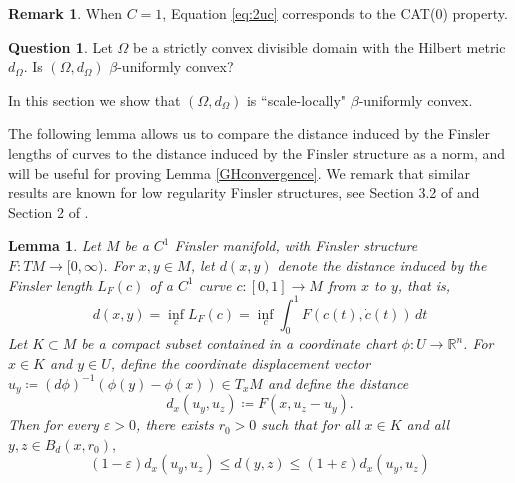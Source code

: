 \documentclass[letterpaper, 11pt, reqno]{amsart}
\newtheorem{lemma}[thm]{Lemma}
\theoremstyle{definition}
\newtheorem{rem}[thm]{Remark}
\newtheorem{question}[thm]{Question}
\begin{document}
\begin{rem}
    When $C=1$, Equation \ref{eq:2uc} corresponds to the CAT(0) property.
\end{rem}

\begin{question}\label{question}
    Let $\Omega$ be a strictly convex divisible domain with the Hilbert metric $d_\Omega$. Is $(\Omega,d_\Omega)$ $\beta$-uniformly convex? 
\end{question}


In this section we show that $(\Omega, d_\Omega)$ is ``scale-locally" $\beta$-uniformly convex. 

The following lemma allows us to compare the distance induced by the Finsler lengths of curves to the distance induced by the Finsler structure as a norm, and will be useful for proving Lemma \ref{GHconvergence}. We remark that similar results are known for low regularity Finsler structures, see Section 3.2 of \cite{LY} and Section 2 of \cite{MT}.

\begin{lemma}\label{closelemma}
    Let $M$ be a $C^1$ Finsler manifold, with Finsler structure $F: TM \rightarrow [0, \infty)$. For $x, y\in M$, let $d(x,y)$ denote the distance  induced by the Finsler length $L_F(c)$ of a $C^1$ curve $c:[0,1] \rightarrow M$ from $x$ to $y$, that is,
    \begin{equation}
        d(x,y) = \inf_cL_F(c)= \inf_c\int_{0}^{1} F(c(t),\dot{c}(t)) \,dt
    \end{equation}
    Let $K \subset M$ be a compact subset contained in a coordinate chart $\phi: U \rightarrow \mathbb{R}^n$. For $x \in K$ and $y \in U$, define the coordinate displacement vector $u_y \coloneq (d\phi)^{-1}(\phi(y) - \phi(x)) \in T_xM$ and define the distance 
    \begin{equation}
    d_x(u_y,u_z) \coloneq F(x, u_z-u_y).
    \end{equation} 
    Then for every $\varepsilon > 0$, there exists $r_0>0$ such that for all $x \in K$ and all $y,z \in B_d(x,r_0),$
    \begin{equation}\label{ineq}
        (1-\varepsilon)d_x(u_y,u_z) \leq d(y,z) \leq (1+\varepsilon)d_x(u_y,u_z)
    \end{equation}
\end{lemma}
\end{document}
